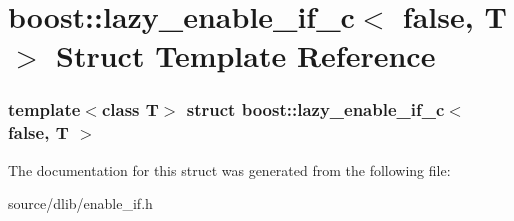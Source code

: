 \hypertarget{structboost_1_1lazy__enable__if__c_3_01false_00_01T_01_4}{
\section{boost::lazy\_\-enable\_\-if\_\-c$<$ false, T $>$ Struct Template Reference}
\label{structboost_1_1lazy__enable__if__c_3_01false_00_01T_01_4}
}
\subsubsection*{template$<$class T$>$ struct boost::lazy\_\-enable\_\-if\_\-c$<$ false, T $>$}



The documentation for this struct was generated from the following file:\begin{DoxyCompactItemize}
\item 
source/dlib/enable\_\-if.h\end{DoxyCompactItemize}

